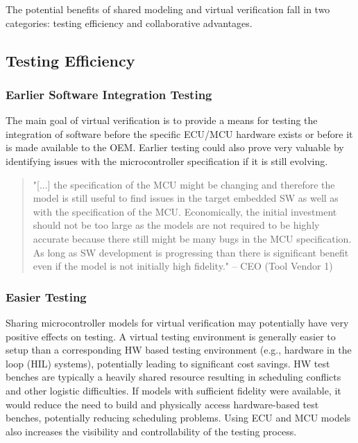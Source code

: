 The potential benefits of shared modeling and virtual verification fall in two categories:
testing efficiency and collaborative advantages.

\subsection{Testing Efficiency}
\subsubsection{Earlier Software Integration Testing}
The main goal of virtual verification is to provide a means for testing the integration of software before the specific ECU/MCU hardware exists or before it is made available to the OEM.
Earlier testing could also prove very valuable by identifying issues with the microcontroller specification if it is still evolving.
\begin{quote}
"[...] the specification of the MCU might be changing and therefore the model is still useful to find issues in the target embedded SW as well as with the specification of the MCU. Economically, the initial investment should not be too large as the models are not required to be highly accurate because there still might be many bugs in the MCU specification. As long as SW development is progressing than there is significant benefit even if the model is not initially high fidelity."
-- CEO (Tool Vendor 1)
\end{quote}

\subsubsection{Easier Testing}
Sharing microcontroller models for virtual verification may potentially have very positive effects on testing. A virtual testing environment is generally easier to setup than a corresponding HW based testing environment (e.g., hardware in the loop (HIL) systems), potentially leading to significant cost savings. HW test benches are typically a heavily shared resource resulting in scheduling conflicts and other logistic difficulties. If models with sufficient fidelity were available, it would reduce the need to build and physically access hardware-based test benches, potentially reducing scheduling problems. Using ECU and MCU models also increases the visibility and controllability of the testing process.

